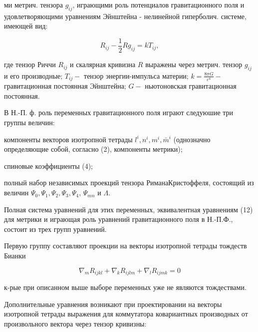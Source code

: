 \documentclass[10pt]{article}
\begin{document}
ми метрич. тензора $g_{i j}$, играющими роль потенциалов гравитационного поля и удовлетворяющими уравнениям Эйнштейна - нелинейной гиперболич. системе, имеющей вид:



\[

R_{i j}-\frac{1}{2} R g_{i j}=k T_{i j},

\]



где тензор Риччи $R_{i j}$ и скалярная кривизна $R$ выражены через метрич. тензор $g_{i j}$ и его производные; $T_{i j}-$ тензор энергии-импульса материи; $k=\frac{8 \pi G}{c^{4}}-$ гравитационная постоянная Эйнштейна; $G-$ ньютоновская гравитационная постоянная.



В Н.-П. ф. роль переменных гравитационного поля играют следуюшие три группы величин:



компоненты векторов изотропной тетрады $l^{i}, n^{i}, m^{i}, \bar{m}^{i}$ (однозначно определяющие собой, согласно (2), компоненты метрики);



спиновые коэффициенты (4);



полный набор независимых проекций тензора РиманаКристоффеля, состоящий из величин $\Psi_{0}, \Psi_{1}, \Psi_{2}, \Psi_{3}, \Psi_{4}$, $\Psi_{m n}$ и $\Lambda$.



Полная система уравнений для этих переменных, эквивалентная уравнениям (12) для метрики и играющая роль уравнений гравитационного поля в Н.-П.Ф., состоит из трех групп уравнений.



Первую группу составляют проекции на векторы изотропной тетрады тождеств Бианки



\[

\nabla_{m} R_{i j k l}+\nabla_{k} R_{i j l m}+\nabla_{l} R_{i j m k}=0

\]



к-рые при описанном выше выборе переменных уже не являются тождествами.



Дополнительные уравнения возникают при проектировании на векторы изотропной тетрады выражения для коммутатора ковариантных производных от произвольного вектора через тензор кривизны:
\end{document}
